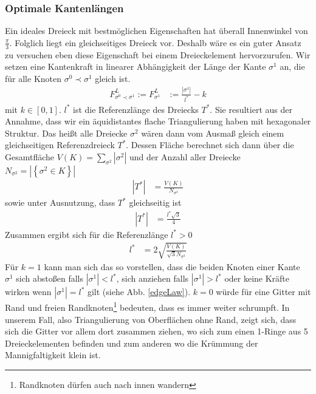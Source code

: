   \subsubsection{Optimale Kantenlängen}
    Ein ideales Dreieck mit bestmöglichen Eigenschaften hat überall Innenwinkel von \( \frac{\pi}{3} \). 
    Folglich liegt ein gleichseitiges Dreieck vor. 
    Deshalb wäre es ein guter Ansatz zu versuchen eben diese Eigenschaft bei einem Dreieckelement hervorzurufen.
    Wir setzen eine Kantenkraft in linearer Abhängigkeit der Länge der Kante \( \sigma^{1} \) an, die für alle Knoten \( \sigma^{0}\prec\sigma^{1} \) gleich ist.
    \begin{align}
       F^{L}_{\sigma^{0}\prec\sigma^{1}} := F^{L}_{\sigma^{1}} &:= \frac{|\sigma^{1}|}{l^{*}} - k
       \label{edgeForce}
    \end{align}
    mit \( k \in [0,1] \). 
    \( l^{*} \) ist die Referenzlänge des Dreiecks \( T^{*} \). Sie resultiert aus der Annahme, dass wir ein äquidistantes flache Triangulierung haben mit hexagonaler Struktur.
    Das heißt alle Dreiecke \( \sigma^{2}\) wären dann vom Ausmaß gleich einem gleichseitigen Referenzdreieck \( T^{*} \).
    Dessen Fläche berechnet sich dann über die Gesamtfläche \( V(K) = \sum_{\sigma^{2}}|\sigma^{2}| \) und der Anzahl aller Dreiecke \( N_{\sigma^{2}} = |\left\{ \sigma^{2} \in K \right\}|\)
    \begin{align}
        |T^{*}| &= \frac{V(K)}{N_{\sigma^{2}}}
    \end{align}
    sowie unter Ausnutzung, dass \( T^{*} \) gleichseitig ist
    \begin{align}
      |T^{*}| &= \frac{l^{*}\sqrt{3}}{4}
    \end{align}
    Zusammen ergibt sich für die Referenzlänge \( l^{*} > 0 \)
    \begin{align}
      l^{*} &= 2 \sqrt{\frac{V(K)}{\sqrt{3}N_{\sigma^{2}}}}
    \end{align}
    Für \( k=1 \) kann man sich das so vorstellen, dass die beiden Knoten einer Kante \( \sigma^{1} \) sich abstoßen falls \( |\sigma^{1}| < l^{*}
    \), sich anziehen falls \( |\sigma^{1}| > l^{*}\) oder keine Kräfte wirken wenn \( |\sigma^{1}| = l^{*}\) gilt (siehe Abb. \ref{edgeLaw}).
    \( k = 0 \) würde für eine Gitter mit Rand und freien Randknoten\footnote{Randknoten dürfen auch nach innen wandern} bedeuten, 
    dass es immer weiter schrumpft. In unserem Fall, also Triangulierung von Oberflächen ohne Rand, zeigt sich, dass sich die Gitter vor allem dort
    zusammen ziehen, wo sich zum einen 1-Ringe aus 5 Dreieckelementen befinden und zum anderen wo die Krümmung der Mannigfaltigkeit klein ist.
